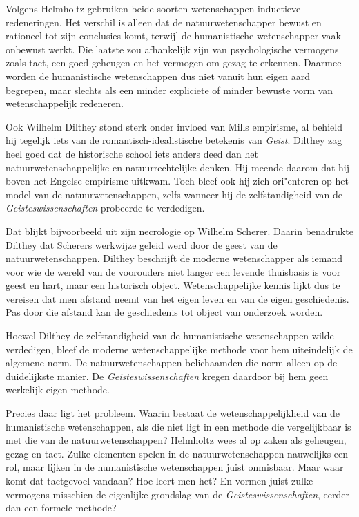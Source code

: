 Volgens Helmholtz gebruiken beide soorten wetenschappen inductieve redeneringen. Het verschil is alleen dat de natuurwetenschapper bewust en rationeel tot zijn conclusies komt, terwijl de humanistische wetenschapper vaak onbewust werkt. Die laatste zou afhankelijk zijn van psychologische vermogens zoals tact, een goed geheugen en het vermogen om gezag te erkennen. Daarmee worden de humanistische wetenschappen dus niet vanuit hun eigen aard begrepen, maar slechts als een minder expliciete of minder bewuste vorm van wetenschappelijk redeneren.

Ook Wilhelm Dilthey stond sterk onder invloed van Mills empirisme, al behield hij tegelijk iets van de romantisch-idealistische betekenis van \textit{Geist}. Dilthey zag heel goed dat de historische school iets anders deed dan het natuurwetenschappelijke en natuurrechtelijke denken. Hij meende daarom dat hij boven het Engelse empirisme uitkwam. Toch bleef ook hij zich ori"enteren op het model van de natuurwetenschappen, zelfs wanneer hij de zelfstandigheid van de \textit{Geisteswissenschaften} probeerde te verdedigen.

Dat blijkt bijvoorbeeld uit zijn necrologie op Wilhelm Scherer. Daarin benadrukte Dilthey dat Scherers werkwijze geleid werd door de geest van de natuurwetenschappen. Dilthey beschrijft de moderne wetenschapper als iemand voor wie de wereld van de voorouders niet langer een levende thuisbasis is voor geest en hart, maar een historisch object. Wetenschappelijke kennis lijkt dus te vereisen dat men afstand neemt van het eigen leven en van de eigen geschiedenis. Pas door die afstand kan de geschiedenis tot object van onderzoek worden.

Hoewel Dilthey de zelfstandigheid van de humanistische wetenschappen wilde verdedigen, bleef de moderne wetenschappelijke methode voor hem uiteindelijk de algemene norm. De natuurwetenschappen belichaamden die norm alleen op de duidelijkste manier. De \textit{Geisteswissenschaften} kregen daardoor bij hem geen werkelijk eigen methode.

Precies daar ligt het probleem. Waarin bestaat de wetenschappelijkheid van de humanistische wetenschappen, als die niet ligt in een methode die vergelijkbaar is met die van de natuurwetenschappen? Helmholtz wees al op zaken als geheugen, gezag en tact. Zulke elementen spelen in de natuurwetenschappen nauwelijks een rol, maar lijken in de humanistische wetenschappen juist onmisbaar. Maar waar komt dat tactgevoel vandaan? Hoe leert men het? En vormen juist zulke vermogens misschien de eigenlijke grondslag van de \textit{Geisteswissenschaften}, eerder dan een formele methode?

